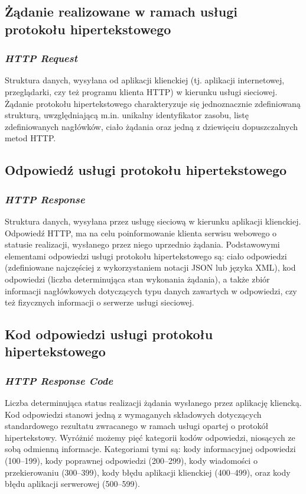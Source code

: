\subsection*{Żądanie realizowane w ramach usługi protokołu hipertekstowego}
\subsubsection{\textit{HTTP Request}}
Struktura danych, wysyłana od aplikacji klienckiej (tj. aplikacji internetowej, przeglądarki, czy też programu klienta HTTP) w kierunku usługi sieciowej. Żądanie protokołu hipertekstowego charakteryzuje się jednoznacznie zdefiniowaną strukturą, uwzględniającą m.in. unikalny identyfikator zasobu, listę zdefiniowanych nagłówków, ciało żądania oraz jedną z dziewięciu dopuszczalnych metod HTTP. 

\subsection*{Odpowiedź usługi protokołu hipertekstowego}
\subsubsection{\textit{HTTP Response}}
Struktura danych, wysyłana przez usługę sieciową w kierunku aplikacji klienckiej. Odpowiedź HTTP, ma na celu poinformowanie klienta serwisu webowego o statusie realizacji, wysłanego przez niego uprzednio żądania. Podstawowymi elementami odpowiedzi usługi protokołu hipertekstowego są: ciało odpowiedzi (zdefiniowane najczęściej z wykorzystaniem notacji JSON lub języka XML), kod odpowiedzi (liczba determinująca stan wykonania żądania), a także zbiór informacji nagłówkowych dotyczących typu danych zawartych w odpowiedzi, czy też fizycznych informacji o serwerze usługi sieciowej.

\subsection*{Kod odpowiedzi usługi protokołu hipertekstowego}
\subsubsection{\textit{HTTP Response Code}}
Liczba determinująca status realizacji żądania wysłanego przez aplikację kliencką. Kod odpowiedzi stanowi jedną z wymaganych składowych dotyczących standardowego rezultatu zwracanego w ramach usługi opartej o protokół hipertekstowy. Wyróżnić możemy pięć kategorii kodów odpowiedzi, niosących ze sobą odmienną informacje. Kategoriami tymi są: kody informacyjnej odpowiedzi (100--199), kody poprawnej odpowiedzi (200--299), kody wiadomości o przekierowaniu (300--399), kody błędu aplikacji klienckiej (400--499), oraz kody błędu aplikacji serwerowej (500--599).

